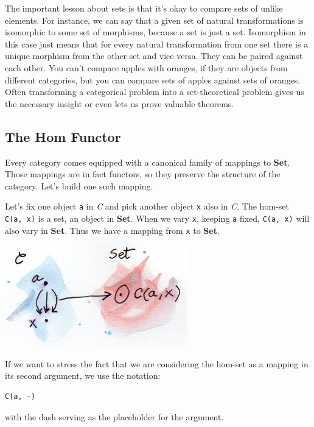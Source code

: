 The important lesson about sets is that it's okay to compare sets of
unlike elements. For instance, we can say that a given set of natural
transformations is isomorphic to some set of morphisms, because a set is
just a set. Isomorphism in this case just means that for every natural
transformation from one set there is a unique morphism from the other
set and vice versa. They can be paired against each other. You can't
compare apples with oranges, if they are objects from different
categories, but you can compare sets of apples against sets of oranges.
Often transforming a categorical problem into a set-theoretical problem
gives us the necessary insight or even lets us prove valuable theorems.

\subsection{The Hom Functor}\label{the-hom-functor}

Every category comes equipped with a canonical family of mappings to
\textbf{Set}. Those mappings are in fact functors, so they preserve the
structure of the category. Let's build one such mapping.

Let's fix one object \texttt{a} in \emph{C} and pick another object
\texttt{x} also in \emph{C}. The hom-set \texttt{C(a,\ x)} is a set, an
object in \textbf{Set}. When we vary \texttt{x}, keeping \texttt{a}
fixed, \texttt{C(a,\ x)} will also vary in \textbf{Set}. Thus we have a
mapping from \texttt{x} to \textbf{Set}.\\
\includegraphics[width=3.12500in]{images/hom-set.jpg}

If we want to stress the fact that we are considering the hom-set as a
mapping in its second argument, we use the notation:

\begin{verbatim}
C(a, -)
\end{verbatim}

with the dash serving as the placeholder for the argument.

